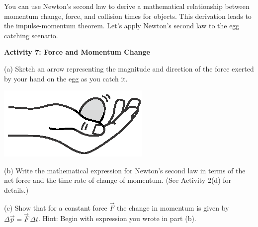 You can use Newton's second law to derive a mathematical relationship between
momentum change, force, and collision times for objects. This derivation leads
to the impulse-momentum theorem. Let's apply Newton's second law to the egg
catching scenario.

\textbf{Activity 7: Force and Momentum Change }

(a) Sketch an arrow representing the magnitude and direction of the force 
exerted by your hand on the egg as you catch it.

{\par\centering \includegraphics{momentum/hand_and_egg.eps} \par}

(b) Write the mathematical expression for Newton's second law in terms of the
net force and the time rate of change of momentum. (See Activity 2(d) for 
details.)
\vspace{20mm}


(c) Show that for a constant force \( {\vec F} \) the change in momentum
is given by \( \Delta {\vec p}={\vec F}\,\Delta t\).  Hint: Begin with expression 
you wrote in part (b).

